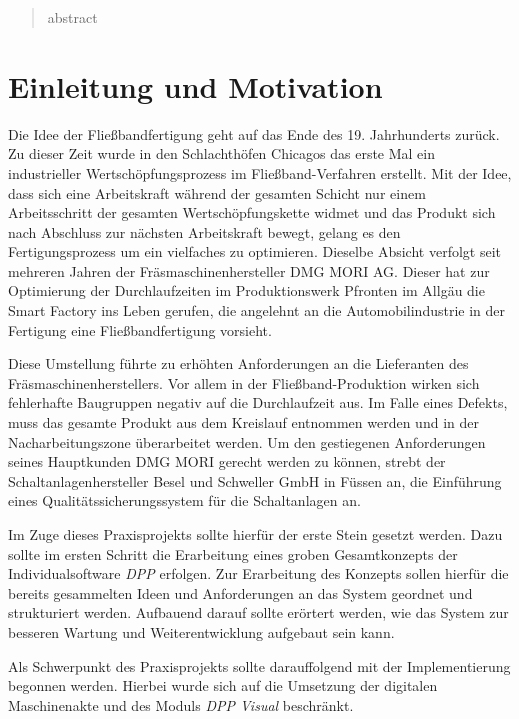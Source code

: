 \documentclass[
    type=Projektarbeit,
    status=draft, %
    language=german, %
    bibengine=bibtex,
]{unibwm-inf-thesis}
\begin{document}
    \tableofcontents

    \mainmatter
    \begin{abstract}
        abstract
    \end{abstract}


    \chapter{Einleitung und Motivation}
    Die Idee der Fließbandfertigung geht auf das Ende des 19. Jahrhunderts zurück.
    Zu dieser Zeit wurde in den Schlachthöfen Chicagos das erste Mal ein industrieller Wertschöpfungsprozess im Fließband-Verfahren erstellt.
    Mit der Idee, dass sich eine Arbeitskraft während der gesamten Schicht nur einem Arbeitsschritt der gesamten Wertschöpfungskette widmet und das Produkt sich nach Abschluss zur nächsten Arbeitskraft bewegt, gelang es den Fertigungsprozess um ein vielfaches zu optimieren.
    Dieselbe Absicht verfolgt seit mehreren Jahren der Fräsmaschinenhersteller DMG MORI AG.
    Dieser hat zur Optimierung der Durchlaufzeiten im Produktionswerk Pfronten im Allgäu die Smart Factory ins Leben gerufen, die angelehnt an die Automobilindustrie in der Fertigung eine Fließbandfertigung vorsieht.

    Diese Umstellung führte zu erhöhten Anforderungen an die Lieferanten des Fräsmaschinenherstellers.
    Vor allem in der Fließband-Produktion wirken sich fehlerhafte Baugruppen negativ auf die Durchlaufzeit aus.
    Im Falle eines Defekts, muss das gesamte Produkt aus dem Kreislauf entnommen werden und in der Nacharbeitungszone überarbeitet werden.
    Um den gestiegenen Anforderungen seines Hauptkunden DMG MORI gerecht werden zu können, strebt der Schaltanlagenhersteller Besel und Schweller GmbH in Füssen an, die Einführung eines Qualitätssicherungssystem für die Schaltanlagen an.

    Im Zuge dieses Praxisprojekts sollte hierfür der erste Stein gesetzt werden.
    Dazu sollte im ersten Schritt die Erarbeitung eines groben Gesamtkonzepts der Individualsoftware \textit{DPP} erfolgen.
    Zur Erarbeitung des Konzepts sollen hierfür die bereits gesammelten Ideen und Anforderungen an das System geordnet und strukturiert werden.
    Aufbauend darauf sollte erörtert werden, wie das System zur besseren Wartung und Weiterentwicklung aufgebaut sein kann.

    Als Schwerpunkt des Praxisprojekts sollte darauffolgend mit der Implementierung begonnen werden.
    Hierbei wurde sich auf die Umsetzung der digitalen Maschinenakte und des Moduls \textit{DPP Visual} beschränkt.
\end{document}
